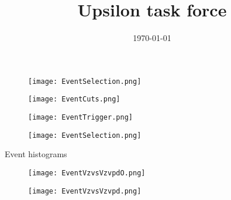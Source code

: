 \documentclass{beamer}
\title[Upsilon task force]{Upsilon task force}
\author{}
\date{\today}
\begin{document}

\begin{frame}
  \titlepage
\end{frame}




\begin{frame}
 	\begin{figure}[h!]
	\centering
	\texttt{[image: EventSelection.png]}
	\end{figure}
\end{frame}

\begin{frame}
 	\begin{figure}[h!]
	\centering
	\texttt{[image: EventCuts.png]}
	\end{figure}
\end{frame}

\begin{frame}
 	\begin{figure}[h!]
	\centering
	\texttt{[image: EventTrigger.png]}
	\end{figure}
\end{frame}

\begin{frame}
 	\begin{figure}[h!]
	\centering
	\texttt{[image: EventSelection.png]}
	\end{figure}
\end{frame}

\begin{frame}[plain,c]
 	\begin{center}
 	\Huge Event histograms
 	\end{center}
	
\end{frame}

\begin{frame}
 	\begin{figure}[h!]
	\centering
	\texttt{[image: EventVzvsVzvpdO.png]}
	\end{figure}
\end{frame}

\begin{frame}
 	\begin{figure}[h!]
	\centering
	\texttt{[image: EventVzvsVzvpd.png]}
	\end{figure}
\end{frame}
\end{document}
